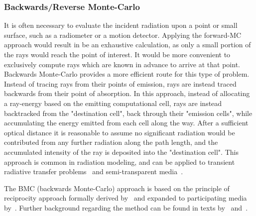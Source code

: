 \subsubsection{Backwards/Reverse Monte-Carlo}
It is often necessary to evaluate the incident radiation upon a point or small surface, such as a radiometer or a motion detector.
Applying the forward-MC approach would result in be an exhaustive calculation, as only a small portion of the rays would reach the point of interest. It would be more convenient to exclusively compute rays which are known in advance to arrive at that point. 
Backwards Monte-Carlo provides a more efficient route for this type of problem.
Instead of tracing rays from their points of emission, rays are instead traced backwards from their point of absorption.
In this approach, instead of allocating a ray-energy based on the emitting computational cell, rays are instead backtracked from the "destination cell", back through their "emission cells", while accumulating the energy emitted from each cell along the way. After a sufficient optical distance it is reasonable to assume no significant radiation would be contributed from any further radiation along the path length, and the accumulated intensity of the ray is deposited into the "destination cell". 
This approach is common in radiation modeling, and can be applied to transient radiative transfer problems~\cite{Lu2004ReverseMedia} and semi-transparent media~\cite{Li2005BackwardSlab}.

The BMC (backwards Monte-Carlo) approach is based on the principle of reciprocity approach formally derived by~\citet{Case1957TransferPrinciple} and expanded to participating media by~\citet{Walters1992RigorousMedia}.
Further background regarding the method can be found in texts by~\citet{Modest2003BackwardTransfer} and~\citet{Howell2010ThermalTransfer}.

